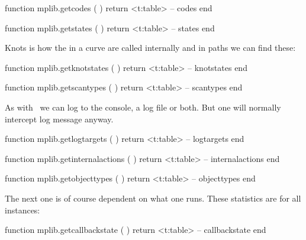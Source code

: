 \starttyping[option=LUA]
function mplib.getcodes ( )
    return <t:table> -- codes
end
\stoptyping

\startfourrows
\stopfourrows

\starttyping[option=LUA]
function mplib.getstates ( )
    return <t:table> -- states
end
\stoptyping

\startfourrows
\stopfourrows

Knots is how the  in a curve are called internally and in paths we
can find these:

\starttyping[option=LUA]
function mplib.getknotstates ( )
    return <t:table> -- knotstates
end
\stoptyping

\startfourrows
\stopfourrows

\starttyping[option=LUA]
function mplib.getscantypes ( )
    return <t:table> -- scantypes
end
\stoptyping

\startfourrows
\stopfourrows

As with \TEX\ we can log to the console, a log file or both. But one will normally
intercept log message anyway.

\starttyping[option=LUA]
function mplib.getlogtargets ( )
    return <t:table> -- logtargets
end
\stoptyping

\startfourrows
\stopfourrows

\starttyping[option=LUA]
function mplib.getinternalactions ( )
    return <t:table> -- internalactions
end
\stoptyping

\startfourrows
\stopfourrows

\starttyping[option=LUA]
function mplib.getobjecttypes ( )
    return <t:table> -- objecttypes
end
\stoptyping

\startfourrows
\stopfourrows

The next one is of course dependent on what one runs. These statistics are for
all instances:

\starttyping[option=LUA]
function mplib.getcallbackstate ( )
    return <t:table> -- callbackstate
end
\stoptyping

\starttworows
\stoptworows


